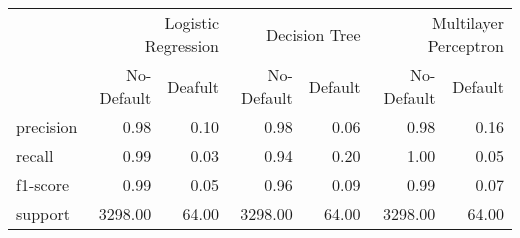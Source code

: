 \begin{table}
\thcenter
\begin{tabular}{lrrrrrr}
 & \multicolumn{2}{r}{Logistic Regression} & \multicolumn{2}{r}{Decision Tree  } & \multicolumn{2}{r}{Multilayer Perceptron} \\
 & No-Default & Deafult & No-Default & Default & No-Default & Default \\
precision & 0.98 & 0.10 & 0.98 & 0.06 & 0.98 & 0.16 \\
recall & 0.99 & 0.03 & 0.94 & 0.20 & 1.00 & 0.05 \\
f1-score & 0.99 & 0.05 & 0.96 & 0.09 & 0.99 & 0.07 \\
support & 3298.00 & 64.00 & 3298.00 & 64.00 & 3298.00 & 64.00 \\
\end{tabular}
\end{table}
